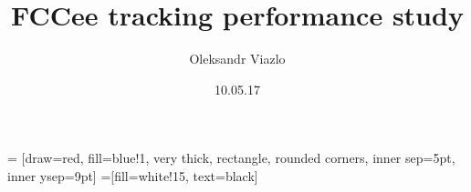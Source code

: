 \documentclass[8pt]{beamer}
\newif\ifplacelogo %
\begin{document}
\newcommand{\yRefPosOne}{0.0}
\newcommand{\xRefPosOne}{0.0}
\newcommand{\yRefPosTwo}{0.0}
\newcommand{\xRefPosTwo}{0.0}
\newcommand{\yRefIncrementOne}{0.0}
\newcommand{\xRefIncrementOne}{0.0}
\newcommand{\yRefIncrementTwo}{0.0}
\newcommand{\xRefIncrementTwo}{0.0}

\graphicspath{{./pictures//}}



\title[FCCee tracking performance \hspace{17em}\insertframenumber/
\inserttotalframenumber]{FCCee tracking performance study}


	\author{Oleksandr Viazlo}
	\date{10.05.17\\}

\placelogofalse

\newcommand{\channel}{enuqqbb}
\newcommand{\goodChannel}{$t\bar{t} \longrightarrow W^{+}bW^{-}\bar{b} \longrightarrow q\bar{q}be^{-}\bar{\nu_{e}}\bar{b} + e^{+}\nu_{e}bq\bar{q}\bar{b}$}
\newcommand{\myNodeOne}{\tikz[baseline,inner sep=1pt] \node[anchor=base]}
\newcommand{\myNodeTwo}{\tikz[baseline,inner sep=1pt] \node[anchor=base]}

 = [draw=red, fill=blue!1, very thick,
    rectangle, rounded corners, inner sep=5pt, inner ysep=9pt]
 =[fill=white!15, text=black]
\end{document}
